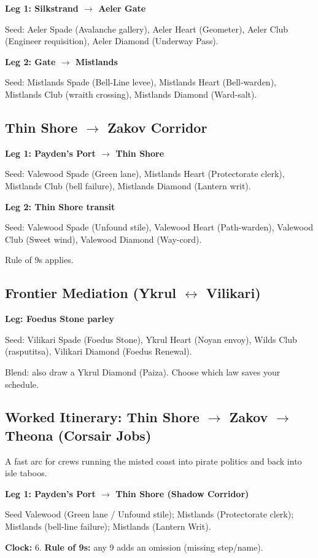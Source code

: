 \documentclass[11pt,letterpaper,twoside]{book}
\begin{document}
\textbf{Leg 1: Silkstrand $\rightarrow$ Aeler Gate}

Seed: Aeler Spade (Avalanche gallery), Aeler Heart (Geometer), Aeler Club (Engineer requisition), Aeler Diamond (Underway Pass).

\textbf{Leg 2: Gate $\rightarrow$ Mistlands}

Seed: Mistlands Spade (Bell-Line levee), Mistlands Heart (Bell-warden), Mistlands Club (wraith crossing), Mistlands Diamond (Ward-salt).

\subsection{Thin Shore $\rightarrow$ Zakov Corridor}

\textbf{Leg 1: Payden's Port $\rightarrow$ Thin Shore}

Seed: Valewood Spade (Green lane), Mistlands Heart (Protectorate clerk), Mistlands Club (bell failure), Mistlands Diamond (Lantern writ).

\textbf{Leg 2: Thin Shore transit}

Seed: Valewood Spade (Unfound stile), Valewood Heart (Path-warden), Valewood Club (Sweet wind), Valewood Diamond (Way-cord).

Rule of 9s applies.

\subsection{Frontier Mediation (Ykrul $\leftrightarrow$ Vilikari)}

\textbf{Leg: Foedus Stone parley}

Seed: Vilikari Spade (Foedus Stone), Ykrul Heart (Noyan envoy), Wilds Club (rasputitsa), Vilikari Diamond (Foedus Renewal).

Blend: also draw a Ykrul Diamond (Paiza). Choose which law saves your schedule.

\subsection{Worked Itinerary: Thin Shore $\rightarrow$ Zakov $\rightarrow$ Theona (Corsair Jobs)}
A fast arc for crews running the misted coast into pirate politics and back into isle taboos.

\textbf{Leg 1: Payden's Port $\rightarrow$ Thin Shore (Shadow Corridor)}
\begin{Leg}{Seed}
Valewood \SuitSpade{} (Green lane / Unfound stile);
Mistlands \SuitHeart{} (Protectorate clerk);
Mistlands \SuitClub{} (bell-line failure);
Mistlands \SuitDiamond{} (Lantern Writ).
\end{Leg}
\textbf{Clock:} 6. \textbf{Rule of 9s:} any 9 adds an omission (missing step/name).
\end{document}
